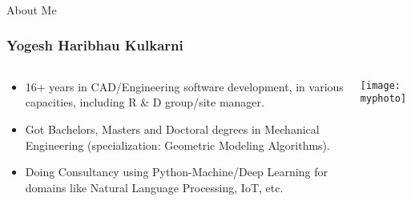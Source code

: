 \begin{frame}[fragile]\frametitle{}
\begin{center}
{\Large About Me}
\end{center}
\end{frame}

\begin{frame}[fragile]\frametitle{Yogesh Haribhau Kulkarni}
\begin{columns}
    \begin{column}[T]{0.6\linewidth}
      \begin{itemize}
		\item 16+ years in CAD/Engineering software development, in various capacities, including R \& D group/site manager. 
		\item Got Bachelors, Masters and Doctoral degrees in Mechanical Engineering (specialization: Geometric Modeling Algorithms). 
		\item Doing Consultancy using Python-Machine/Deep Learning for domains like Natural Language Processing, IoT, etc.
	  \end{itemize}

    \end{column}
    \begin{column}[T]{0.4\linewidth}
      \centering
      \texttt{[image: myphoto]}
    \end{column}
  \end{columns}
\end{frame}


